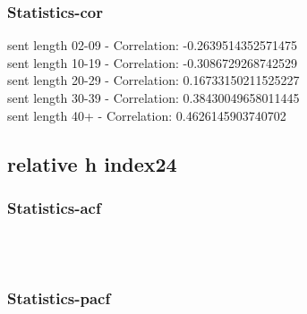 \documentclass{article}%
\begin{document}
%
\newpage%
\subsubsection{Statistics{-}cor}%
\label{ssubsec:Statistics{-}cor}%
\noindent%
sent length 02-09 - Correlation: -0.2639514352571475\\%
sent length 10-19 - Correlation: -0.3086729268742529\\%
sent length 20-29 - Correlation: 0.16733150211525227\\%
sent length 30-39 - Correlation: 0.38430049658011445\\%
sent length 40+ - Correlation: 0.4626145903740702\\

%
\newpage

%
\subsection{relative h index24}%
\label{subsec:relativehindex24}%
\subsubsection{Statistics{-}acf}%
\label{ssubsec:Statistics{-}acf}%


\begin{figure}[ht]%
\centering%
\setlength{\abovecaptionskip}{-35pt}%
%
%
\\%
%
%
\\%
%
\end{figure}

%
\newpage%
\subsubsection{Statistics{-}pacf}%
\label{ssubsec:Statistics{-}pacf}%
\end{document}
